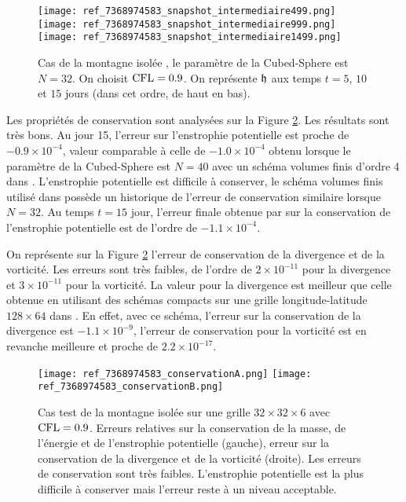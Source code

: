 \begin{figure}[htbp]
\begin{center}
\texttt{[image: ref\_7368974583\_snapshot\_intermediaire499.png]}\\
\texttt{[image: ref\_7368974583\_snapshot\_intermediaire999.png]}\\
\texttt{[image: ref\_7368974583\_snapshot\_intermediaire1499.png]}
\end{center}
\caption{Cas de la montagne isolée \cite{Williamson1992}, le paramètre de la Cubed-Sphere est $N=32$. On choisit $\text{CFL}=0.9$.  On représente $\mathfrak{h}$ aux temps $t=5$, $10$ et $15$ jours (dans cet ordre, de haut en bas).}
\label{fig: williamson 5 space height}
\end{figure}

Les propriétés de conservation sont analysées sur la Figure \ref{fig: williamson 5 conservation}. Les résultats sont très bons. Au jour 15, l'erreur sur l'enstrophie potentielle est proche de $-0.9 \times 10^{-4}$, valeur comparable à celle de $-1.0 \times 10^{-4}$ obtenu lorsque le paramètre de la Cubed-Sphere est $N=40$ avec un schéma volumes finis d'ordre 4 dans \cite{Ullrich2010}. L'enstrophie potentielle est difficile à conserver, le schéma volumes finis utilisé dans \cite{Chen2008} possède un historique de l'erreur de conservation similaire lorsque $N=32$. Au temps $t=15$ jour, l'erreur finale obtenue par \cite{Chen2008} sur la conservation de l'enstrophie potentielle est de l'ordre de $-1.1 \times 10^{-4}$.

On représente sur la Figure \ref{fig: williamson 5 conservation} l'erreur de conservation de la divergence et de la vorticité. Les erreurs sont très faibles, de l'ordre de $2 \times 10^{-11}$ pour la divergence et $3 \times 10^{-11}$ pour la vorticité. La valeur pour la divergence est meilleur que celle obtenue en utilisant des schémas compacts sur une grille longitude-latitude $128 \times 64$ dans \cite{Nihei2003}. En effet, avec ce schéma, l'erreur sur la conservation de la divergence est $-1.1 \times 10^{-9}$, l'erreur de conservation pour la vorticité est en revanche meilleure et proche de $2.2 \times 10^{-17}$. 

\begin{figure}[htbp]
\begin{center}
\texttt{[image: ref\_7368974583\_conservationA.png]}
\texttt{[image: ref\_7368974583\_conservationB.png]}
\end{center}
\caption{Cas test de la montagne isolée \cite{Williamson1992} sur une grille $32 \times 32 \times 6$ avec $\text{CFL}=0.9$. Erreurs relatives sur la conservation de la masse, de l'énergie et de l'enstrophie potentielle (gauche), erreur sur la conservation de la divergence et de la vorticité (droite). Les erreurs de conservation sont très faibles. L'enstrophie potentielle est la plus difficile à conserver mais l'erreur reste à un niveau acceptable.}
\label{fig: williamson 5 conservation}
\end{figure}

